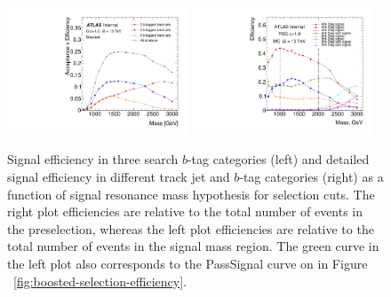 \begin{figure}
\begin{center}
\includegraphics[angle=270, width=0.48\textwidth]{./figures/boosted/SigEff/region_lst_Moriond_bkg_9_Efficiency_PreSel.pdf}
\includegraphics[angle=270, width=0.48\textwidth]{./figures/boosted/SigEff/detail_lst_Moriond_Efficiency_AllTag_Signal.pdf}
  \caption{Signal efficiency in three search $b$-tag categories (left) and detailed signal efficiency in different track jet and $b$-tag categories (right) as a function of signal resonance mass hypothesis for selection cuts. The right plot efficiencies are relative to the total number of events in the preselection, whereas the left plot efficiencies are relative to the total number of events in the signal mass region. The green curve in the left plot also corresponds to the PassSignal curve on in Figure ~\ref{fig:boosted-selection-efficiency}.}
  \label{fig:boosted-selection-signal-efficiency}
\end{center}
\end{figure}

